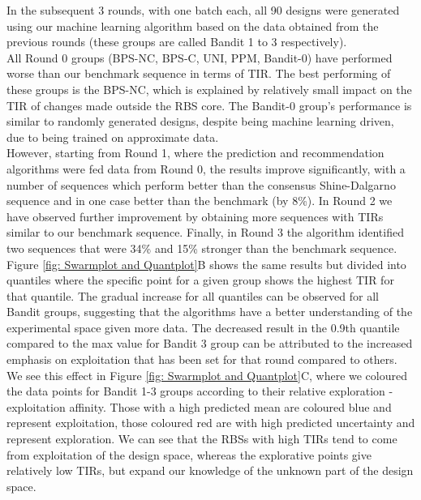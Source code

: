 \documentclass{article}
\begin{document}
In the subsequent 3 rounds, with one batch each, all 90 designs were generated using our machine learning algorithm based on the data obtained from the previous rounds (these groups are called Bandit 1 to 3 respectively).\\

All Round 0 groups (BPS-NC, BPS-C, UNI, PPM, Bandit-0) have performed worse than our benchmark sequence in terms of TIR. 
The best performing of these groups is the BPS-NC, which is explained by relatively small impact on the TIR of changes made outside the RBS core. 
The Bandit-0 group's performance is similar to randomly generated designs, despite being machine learning driven, due to being trained on approximate data.\\

However, starting from Round 1, where the prediction and recommendation algorithms were fed data from Round 0, the results improve significantly, with a number of sequences which perform better than the consensus Shine-Dalgarno sequence and in one case better than the benchmark (by 8\%).
In Round 2 we have observed further improvement by obtaining more sequences with TIRs similar to our benchmark sequence.
Finally, in Round 3 the algorithm identified two sequences that were 34\% and 15\% stronger than the benchmark sequence.\\

Figure \ref{fig: Swarmplot and Quantplot}B shows the same results but divided into quantiles where the specific point for a given group shows the highest TIR for that quantile.
The gradual increase for all quantiles can be observed for all Bandit groups, suggesting that the algorithms have a better understanding of the experimental space given more data.
The decreased result in the 0.9th quantile compared to the max value for Bandit 3 group can be attributed to the increased emphasis on exploitation that has been set for that round compared to others.
We see this effect in Figure \ref{fig: Swarmplot and Quantplot}C, where we coloured the data points for Bandit 1-3 groups according to their relative exploration - exploitation affinity.
Those with a high predicted mean are coloured blue and represent exploitation, those coloured red are with high predicted uncertainty and represent exploration.
We can see that the RBSs with high TIRs tend to come from exploitation of the design space, whereas the explorative points give relatively low TIRs, but expand our knowledge of the unknown part of the design space.\\
\end{document}
